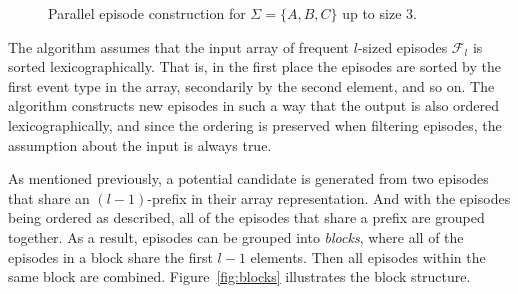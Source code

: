 \begin{figure}
\centering


\caption{Parallel episode construction for $ \Sigma = \{ A, B, C \} $ up to size 3.}

\label{fig:parallel-episode-lattice}
\end{figure}

The algorithm assumes that the input array of frequent $ l $-sized episodes $ \mathcal{F}_l $ is sorted lexicographically. That is, in the first place the episodes are sorted by the first event type in the array, secondarily by the second element, and so on. The algorithm constructs new episodes in such a way that the output is also ordered lexicographically, and since the ordering is preserved when filtering episodes, the assumption about the input is always true.

As mentioned previously, a potential candidate is generated from two episodes that share an $ (l - 1) $-prefix in their array representation. And with the episodes being ordered as described, all of the episodes that share a prefix are grouped together. As a result, episodes can be grouped into \emph{blocks}, where all of the episodes in a block share the first $ l - 1 $ elements. Then all episodes within the same block are combined. Figure~\ref{fig:blocks} illustrates the block structure.

